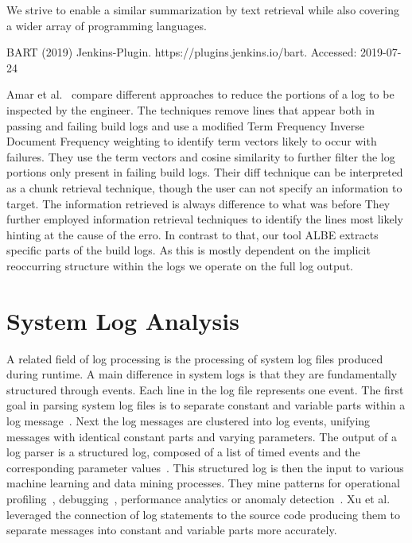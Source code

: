 \documentclass[\myrootdir/main.tex]{subfiles}
\begin{document}
We strive to enable a similar summarization by text retrieval while also covering a wider array of programming languages.

BART (2019) Jenkins-Plugin. https://plugins.jenkins.io/bart. Accessed: 2019-07-24

Amar et al.~\cite{amar2019mining}  compare different approaches to reduce the portions of a log to be inspected by the engineer.
The techniques remove lines that appear both in passing and failing build logs and use a modified Term Frequency Inverse Document Frequency weighting to identify term vectors likely to occur with failures.
They use the term vectors and cosine similarity to further filter the log portions only present in failing build logs.
Their diff technique can be interpreted as a chunk retrieval technique, though the user can not specify an information to target.
The information retrieved is always difference to what was before 
They further employed information retrieval techniques to identify the lines most likely hinting at the cause of the erro.
In contrast to that, our tool ALBE extracts specific parts of the build logs.
As this is mostly dependent on the implicit reoccurring structure within the logs we operate on the full log output.

\section{System Log Analysis} 

A related field of log processing is the processing of system log files produced during runtime.
A main difference in system logs is that they are fundamentally structured through events.
Each line in the log file represents one event.
The first goal in parsing system log files is to separate constant and variable parts within a log message~\cite{nagappan2010abstracting,he2017towards}.
Next the log messages are clustered into log events, unifying messages with identical constant parts and varying parameters.
The output of a log parser is a structured log, composed of a list of timed events and the corresponding parameter values~\cite{he2016evaluation}.
This structured log is then the input to various machine learning and data mining processes.
They mine patterns for operational profiling~\cite{nagappan2009efficiently}, debugging~\cite{oliner2012advances}, performance analytics or anomaly detection~\cite{nagappan2010abstracting}.
Xu et al.~\cite{xu2009detecting} leveraged the connection of log statements to the source code producing them to separate messages into constant and variable parts more accurately.
\end{document}
